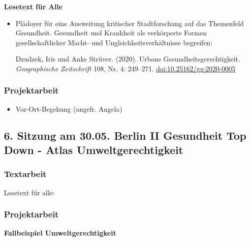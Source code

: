 \documentclass[
  ngerman,
]{article}
\providecommand{\tightlist}{%
  \setlength{\itemsep}{0pt}\setlength{\parskip}{0pt}}
\begin{document}
\textbf{Lesetext für Alle}

\begin{itemize}
\item
  Plädoyer für eine Ausweitung kritischer Stadtforschung auf das Themenfeld Gesundheit. Gesundheit und Krankheit als verkörperte Formen gesellschaftlicher Macht- und Ungleichheitsverhältnisse begreifen:

  Dzudzek, Iris und Anke Strüver. (2020). Urbane Gesundheitsgerechtigkeit. \emph{Geographische Zeitschrift} 108, Nr. 4: 249--271. \url{doi:10.25162/gz-2020-0005}
\end{itemize}

\hypertarget{projektarbeit-3}{%
\subsubsection*{Projektarbeit}\label{projektarbeit-3}}

\begin{itemize}
\tightlist
\item
  Vor-Ort-Begehung (angefr. Angela)
\end{itemize}

\hypertarget{sitzung-am-30.05.-berlin-ii-gesundheit-top-down---atlas-umweltgerechtigkeit}{%
\subsection*{6. Sitzung am 30.05. \textbar{} Berlin II Gesundheit Top Down - Atlas Umweltgerechtigkeit}\label{sitzung-am-30.05.-berlin-ii-gesundheit-top-down---atlas-umweltgerechtigkeit}}

\hypertarget{textarbeit-5}{%
\subsubsection*{Textarbeit}\label{textarbeit-5}}

Lesetext für alle:

\hypertarget{projektarbeit-4}{%
\subsubsection*{Projektarbeit}\label{projektarbeit-4}}

\textbf{Fallbeispiel Umweltgerechtigkeit}
\end{document}
